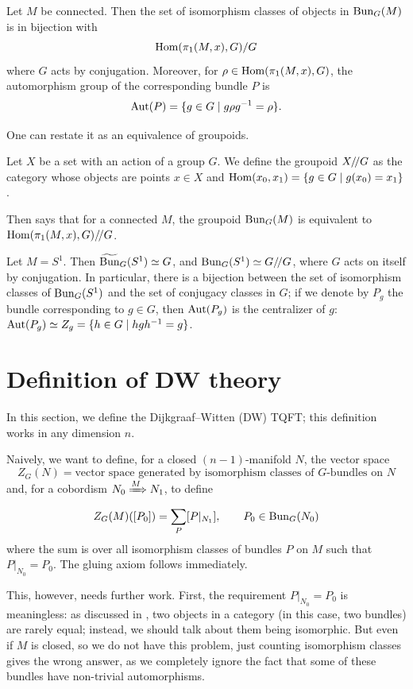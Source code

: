 \begin{lemma}\label{l:monodromy2}
  Let $M$ be connected. Then the set of isomorphism classes of objects
  in $\operatorname{Bun}_G(M)$ is in bijection with
  $$
    \operatorname{Hom}(\pi_1(M,x),G)/G
  $$
  where $G$ acts by conjugation. Moreover, for $\rho \in \operatorname{Hom}(\pi_1(M,x),G)$,
  the automorphism group of the corresponding bundle $P$ is
  \begin{equation}\label{e:aut-bundle-monodromy}
    \operatorname{Aut}(P) = \{g\in G\; | \; g\rho g^{-1} = \rho\}.
  \end{equation}
\end{lemma}
One can restate it as an equivalence of groupoids.
\begin{definition}\label{d:action-groupoid}
  Let $X$ be a set with an action of a group $G$. We define the
  groupoid $X/ \! / G$ as the category whose objects are points $x\in X$ and
  $\operatorname{Hom}(x_0, x_1)=\{g\in G\; | \; g(x_0)=x_1\}$.
\end{definition}
Then  says that for a connected $M$, the groupoid
$\operatorname{Bun}_G(M)$ is equivalent to $\operatorname{Hom}(\pi_1(M,x),G)/ \! / G$.


\begin{example}\label{x:bundles_s1}
  Let $M=S^1$. Then $\widetilde{\operatorname{Bun}}_G(S^1)\simeq G$, and $\operatorname{Bun}_G(S^1)\simeq G/ \! / G$,
  where $G$ acts on itself by conjugation. In particular, there is
  a bijection between the set of isomorphism classes of $\operatorname{Bun}_G(S^1)$ and the
  set of conjugacy classes in $G$; if we denote by $P_g$ the bundle
  corresponding to $g\in G$, then $\operatorname{Aut}(P_g)$ is the centralizer of $g$:
  $\operatorname{Aut}(P_g)\simeq Z_g=\{h\in G\; | \; hgh^{-1}=g\}$.
\end{example}

\section{Definition of DW theory}\label{s:DW-definition}
In this section, we define the Dijkgraaf--Witten (DW) TQFT; this definition
works in any dimension $n$.

Naively, we want to define, for a closed $(n-1)$-manifold $N$, the vector space
$$
  Z_G(N)=\text{vector space generated by isomorphism classes of
    $G$-bundles on $N$}
$$
and, for a cobordism $N_0\xRightarrow{M}N_1$, to define
$$
  Z_G(M)([P_0])=\sum_{P} [P|_{N_1}],\qquad P_0\in \operatorname{Bun}_G(N_0)
$$
where the sum is over all isomorphism classes of bundles $P$ on $M$ such that
$P|_{N_0}=P_0$. The gluing axiom follows immediately.

This, however, needs further work. First, the requirement $P|_{N_0}=P_0$
is meaningless: as discussed in ,
two objects in a category (in this case, two bundles) are rarely
equal; instead, we should talk about them being isomorphic. But even if $M$ is
closed, so we do not have this problem, just counting isomorphism classes gives
the wrong answer, as we completely ignore the fact that some of these bundles
have non-trivial automorphisms.

